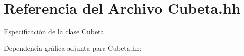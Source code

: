 \hypertarget{_cubeta_8hh}{}\section{Referencia del Archivo Cubeta.\+hh}
\label{_cubeta_8hh}


Especificación de la clase \hyperlink{class_cubeta}{Cubeta}.  


Dependencia gráfica adjunta para Cubeta.\+hh\+:
